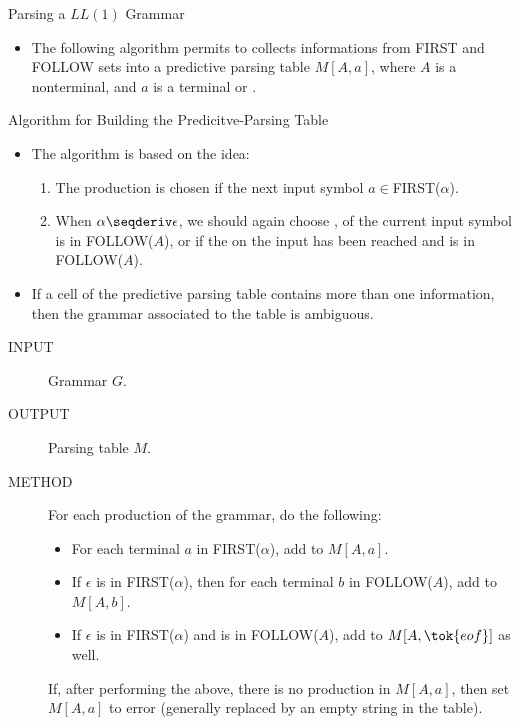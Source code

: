\begin{bibunit}[apalike]
\begin{frame}{Parsing a $LL(1)$ Grammar}
	\vfill
	\begin{itemize}
	\item The following algorithm permits to collects informations from FIRST and FOLLOW sets into a predictive parsing table $M[A,a]$, where $A$ is a nonterminal, and $a$ is a terminal or .
	\end{itemize}
\end{frame}

\begin{frame}[allowframebreaks]{Algorithm for Building the Predicitve-Parsing Table}
	\vfill
	\begin{itemize}
	\item The algorithm is based on the idea:
		\begin{enumerate}
		\item The production  is chosen if the next input symbol $a \in $FIRST($\alpha$).
		\item When $\alpha\seqderiv\epsilon$, we should again choose , of the current input symbol is in FOLLOW($A$), or if the  on the input has been reached and  is in FOLLOW($A$).
		\end{enumerate}
	\vfill
	\item If a cell of the predictive parsing table contains more than one information, then the grammar associated to the table is ambiguous.
	\end{itemize}
	\vfill
	\framebreak
	\begin{description}
	\item[INPUT] Grammar $G$.
	\item[OUTPUT] Parsing table $M$.
	\item[METHOD] For each production  of the grammar, do the following:
		\begin{itemize}
		\item For each terminal $a$ in FIRST($\alpha$), add  to $M[A,a]$.
		\item If $\epsilon$ is in FIRST($\alpha$), then for each terminal $b$ in FOLLOW($A$), add  to $M[A,b]$.
		\item If $\epsilon$ is in FIRST($\alpha$) and  is in FOLLOW($A$), add  to $M[A,\tok{eof}]$ as well.
		\end{itemize}
		\vspace{1em}
		If, after performing the above, there is no production in $M[A,a]$, then set $M[A,a]$ to error (generally replaced by an empty string in the table).
	\end{description}
\end{frame}


\end{bibunit}
